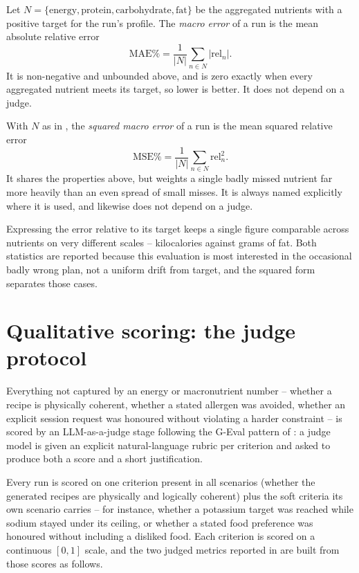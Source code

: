 \begin{definition}
    \label{def:macro-error}
    Let $N = \{\text{energy}, \text{protein}, \text{carbohydrate}, \text{fat}\}$ be the aggregated nutrients with a positive target for the run's profile. The \emph{macro error} of a run is the mean absolute relative error
    \[
        \mathrm{MAE\%} = \frac{1}{\left| N \right|} \sum_{n \in N} \left| \mathrm{rel}_n \right|.
    \]
    It is non-negative and unbounded above, and is zero exactly when every aggregated nutrient meets its target, so lower is better. It does not depend on a judge.
\end{definition}

\begin{definition}
    \label{def:macro-error-squared}
    With $N$ as in , the \emph{squared macro error} of a run is the mean squared relative error
    \[
        \mathrm{MSE\%} = \frac{1}{\left| N \right|} \sum_{n \in N} \mathrm{rel}_n^2.
    \]
    It shares the properties above, but weights a single badly missed nutrient far more heavily than an even spread of small misses. It is always named explicitly where it is used, and likewise does not depend on a judge.
\end{definition}

Expressing the error relative to its target keeps a single figure comparable across nutrients on very different scales -- kilocalories against grams of fat. Both statistics are reported because this evaluation is most interested in the occasional badly wrong plan, not a uniform drift from target, and the squared form separates those cases.

\section{Qualitative scoring: the judge protocol}
\label{sec:methodology-qualitative}

Everything not captured by an energy or macronutrient number -- whether a recipe is physically coherent, whether a stated allergen was avoided, whether an explicit session request was honoured without violating a harder constraint -- is scored by an LLM-as-a-judge stage following the G-Eval pattern of : a judge model is given an explicit natural-language rubric per criterion and asked to produce both a score and a short justification.

Every run is scored on one criterion present in all scenarios (whether the generated recipes are physically and logically coherent) plus the soft criteria its own scenario carries -- for instance, whether a potassium target was reached while sodium stayed under its ceiling, or whether a stated food preference was honoured without including a disliked food. Each criterion is scored on a continuous $[0, 1]$ scale, and the two judged metrics reported in  are built from those scores as follows.

